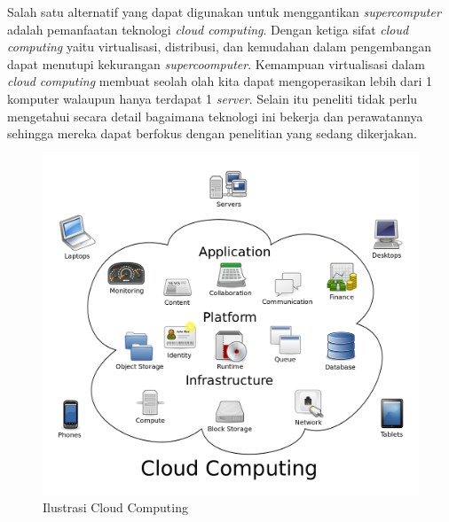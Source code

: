Salah satu alternatif yang dapat digunakan untuk menggantikan \textit{supercomputer} adalah pemanfaatan teknologi \textit{cloud computing}. Dengan ketiga sifat \textit{cloud computing} yaitu virtualisasi, distribusi, dan kemudahan dalam pengembangan dapat menutupi kekurangan \textit{supercoomputer}. Kemampuan virtualisasi dalam \textit{cloud computing} membuat seolah olah kita dapat mengoperasikan lebih dari 1 komputer walaupun hanya terdapat 1 \textit{server}. Selain itu peneliti tidak perlu mengetahui secara detail bagaimana teknologi ini bekerja dan perawatannya sehingga mereka dapat berfokus dengan penelitian yang sedang dikerjakan.
\begin{figure}
	\centering
	\includegraphics[scale=0.1]{cloud_computing.png}
	\caption{Ilustrasi Cloud Computing}
\end{figure}

